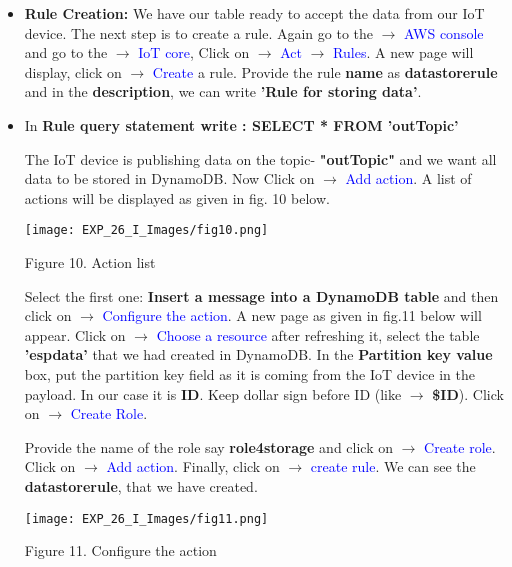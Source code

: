 \documentclass[12pt,a4paper]{article}
\begin{document}
\begin{justify}
\begin{itemize}
\item \textbf{Rule Creation:} We have our table ready to accept the data from our IoT device. The next step is to create a rule. Again go to the $ \rightarrow $ \textcolor{blue}{AWS console} and go to the $ \rightarrow $ \textcolor{blue}{IoT core}, Click on $ \rightarrow $  \textcolor{blue}{Act} $ \rightarrow $  \textcolor{blue}{Rules}.
A new page will display, click on $ \rightarrow $ \textcolor{blue}{Create} a rule. Provide the rule \textbf{name} as \textbf{datastorerule} and in the \textbf{description}, we can write \textbf{'Rule for storing data'}.
\item In \textbf{Rule query statement write :  SELECT * FROM 'outTopic'}

The IoT device is publishing data on the topic- \textbf{"outTopic"} and we want all data to be stored in DynamoDB. Now Click on $ \rightarrow $  \textcolor{blue}{Add action}. A list of actions will be displayed as given in fig. 10 below.

\begin{center} 
\texttt{[image: EXP\_26\_I\_Images/fig10.png]}
\end{center}
\vspace{-10mm}
\begin{center} {Figure 10. Action list }\end{center}

Select the first one: \textbf{Insert a message into a DynamoDB table} and then click on $ \rightarrow $ \textcolor{blue}{Configure the action}. A new page as given in fig.11 below will appear. Click on $ \rightarrow $ \textcolor{blue}{Choose a resource} after refreshing it, select the table \textbf{'espdata'} that we had created in DynamoDB. In the \textbf{Partition key value} box, put the partition key field as it is coming from the IoT device in the payload. In our case it is \textbf{ID}. Keep dollar sign before ID (like $ \rightarrow $ \textbf{\$ID}). Click on $ \rightarrow $ \textcolor{blue}{Create Role}.\par
Provide the name of the role say \textbf{role4storage} and click on $ \rightarrow $ \textcolor{blue}{Create role}. Click on $ \rightarrow $ \textcolor{blue}{Add action}. Finally, click on $ \rightarrow $ \textcolor{blue}{create rule}. We can see the \textbf{datastorerule}, that we have created.

\begin{center} 
\texttt{[image: EXP\_26\_I\_Images/fig11.png]}
\end{center}
\vspace{-10mm}
\begin{center} {Figure 11. Configure the action  }\end{center}


\end{itemize}
\end{justify}
\end{document}
